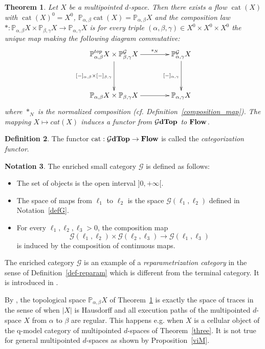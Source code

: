 \documentclass[a4paper,12pt]{amsart}
\makeatletter
\newcommand{\p}{\times}
\renewcommand{\P}{\mathbb{P}}
\newtheorem{thm}{Theorem}[section]
\newcommand{\bth}{\begin{thm}}
\renewcommand{\eth}{\end{thm}}
\theoremstyle{definition}
\newtheorem{defn}[thm]{Definition}
\newcommand{\bd}{\begin{defn}}
\newcommand{\ed}{\end{defn}}
\newtheorem{nota}[thm]{Notation}
\newcommand{\fr}[1]{\ar@{->}[r]^-{#1}}
\newcommand{\fd}[1]{\ar@{->}[d]_-{#1}}
\newcommand{\ptop}[1]{{\brm{{#1}dTop}}}
\newcommand{\brm}[1]{{\rm{\mathbf{#1}}}}
\newcommand{\dtop}{{\brm{Flow}}}
\DeclareMathOperator{\Cat}{\mathrm{cat}}
\renewcommand{\P}{\mathbb{P}}
\makeatother
\begin{document}
\bth \cite[Theorem~7.2]{mdtop} \label{decomposing}
Let $X$ be a multipointed $d$-space. Then there exists a flow $\Cat(X)$ with $\Cat(X)^0=X^0$, $\P_{\alpha,\beta}\Cat(X)= \P_{\alpha,\beta}X$ and the composition law $*:\P_{\alpha,\beta}X \p \P_{\beta,\gamma}X \rightarrow \P_{\alpha,\gamma}X$ is for every triple $(\alpha,\beta,\gamma)\in X^0\p X^0\p X^0$ the unique map making the following diagram commutative:
\[
\xymatrix@C=4em@R=4em{
	\P^{top}_{\alpha,\beta}X \p \P_{\beta,\gamma}^{\mathcal{G}}X
	\fr{*_{N}}\fd{[-]_{\alpha,\beta}\p [-]_{\beta,\gamma}} &
	\P_{\alpha,\gamma}^{\mathcal{G}}X \fd{[-]_{\alpha,\gamma}} \\
	\P_{\alpha,\beta}X \p \P_{\beta,\gamma}X \fr{} &
	\P_{\alpha,\gamma}X}
\] 
where $*_N$ is the normalized composition (cf. Definition~\ref{composition_map}).  The mapping $X \mapsto cat(X)$ induces a functor from $\ptop{\mathcal{G}}$ to $\dtop$.  \eth

\bd \label{cat-func} The functor $\Cat:\ptop{\mathcal{G}}\to \dtop$ is called the \textit{categorization functor}. \ed


\begin{nota} \label{defGcat}
	The enriched small category $\mathcal{G}$ is defined as follows: 
\begin{itemize}[leftmargin=*]
	\item The set of objects is the open interval $]0,+\infty[$.
	\item The space of maps from $\ell_1$ to $\ell_2$ is the space $\mathcal{G}(\ell_1,\ell_2)$ defined in Notation~\ref{defG}.
	\item For every $\ell_1,\ell_2,\ell_3>0$, the composition map \[\mathcal{G}(\ell_1,\ell_2)\p \mathcal{G}(\ell_2,\ell_3) \to \mathcal{G}(\ell_1,\ell_3)\] is induced by the composition of continuous maps. 
\end{itemize}
\end{nota}

The enriched category $\mathcal{G}$ is an example of a \textit{reparametrization category} in the sense of Definition~\ref{def-reparam} which is different from the terminal category. It is introduced in \cite[Proposition~4.9]{Moore1}. 

By \cite[Proposition~3.8]{reparam}, the topological space $\P_{\alpha,\beta}X$ of Theorem~\ref{decomposing} is exactly the space of traces in the sense of \cite{MR2521708} when $|X|$ is Hausdorff and all execution paths of the multipointed $d$-space $X$ from $\alpha$ to $\beta$ are regular. This happens e.g. when $X$ is a cellular object of the q-model category of multipointed $d$-spaces of Theorem~\ref{three}. It is not true for general multipointed $d$-spaces as shown by Proposition~\ref{viM}. 
\end{document}
